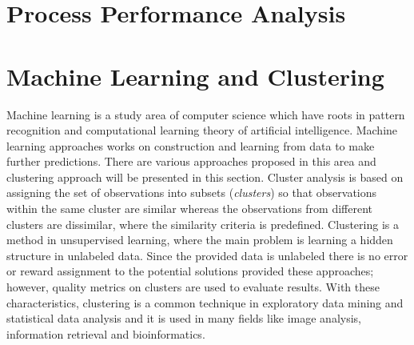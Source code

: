 \section{Process Performance Analysis}
\label{sec:process-performance-analysis}

\section{Machine Learning and Clustering}
\label{sec:unsupervised-learning}
Machine learning is a study area of computer science which have roots in pattern recognition and computational learning theory of artificial intelligence. Machine learning approaches works on construction and learning from data to make further predictions. There are various approaches proposed in this area and clustering approach will be presented in this section. Cluster analysis is based on assigning the set of observations into subsets (\textit{clusters}) so that observations within the same cluster are similar whereas the observations from different clusters are dissimilar, where the similarity criteria is predefined. Clustering is a method in unsupervised learning, where the main problem is learning a hidden structure in unlabeled data. Since the provided data is unlabeled there is no error or reward assignment to the potential solutions provided these approaches; however, quality metrics on clusters are used to evaluate results. With these characteristics, clustering is a common technique in exploratory data mining and statistical data analysis and it is used in many fields like image analysis, information retrieval and bioinformatics.

